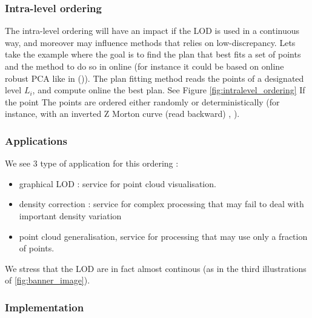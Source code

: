 		\subsubsection{Intra-level ordering}
		\label{method.intralevel}
		
		
		The intra-level ordering will have an impact if the LOD is used in a continuous way,
		and moreover may influence methods that relies on low-discrepancy.
		Lets take the example where the goal is to find the plan that best fits a set of points
		and the method to do so in online (for instance it could be based on online robust PCA like in (\cite{Feng2013})).
		The plan fitting method reads the points of a designated level $L_i$, and compute online the best plan.
		See Figure \ref{fig:intralevel_ordering}
		If the point  
		The points are ordered either randomly or deterministically (for instance, with an inverted Z Morton curve (read backward) , ).
		
				
		
		\subsubsection{Applications}
			We see 3 type of application for this ordering :
			\begin{itemize}
				\item graphical LOD : service for point cloud visualisation.
				\item density correction : service for complex processing that may fail to deal with important density variation
				\item point cloud generalisation, service for processing that may use only a fraction of points.
			\end{itemize}	
			
			We stress that the LOD are in fact almost continous (as in the third illustrations of \ref{fig:banner_image}).
					
					
		\subsubsection{Implementation}
			
